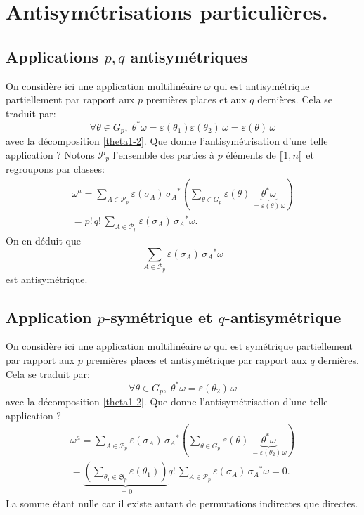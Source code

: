 \section*{Antisymétrisations particulières.}
\subsection*{Applications $p,q$ antisymétriques}
On considère ici une application multilinéaire $\omega$ qui est antisymétrique partiellement par rapport aux $p$ premières places et aux $q$ dernières. Cela se traduit par:
\[
 \forall \theta \in G_p,\; \theta^* \omega = \varepsilon(\theta_1) \varepsilon(\theta_2)\,\omega = \varepsilon(\theta)\, \omega
\]
avec la décomposition \ref{theta1-2}.\newline
Que donne l'antisymétrisation d'une telle application ?\newline
Notons $\mathcal{P}_p$ l'ensemble des parties à $p$ éléments de $\llbracket 1,n\rrbracket$ et regroupons par classes:
\begin{multline*}
 \omega^a = \sum_{A \in \mathcal{P}_p} \varepsilon(\sigma_A)\,{\sigma_A}^*\left( \sum_{\theta \in G_p}\varepsilon(\theta)\,\underset{=\varepsilon(\theta)\,\omega}{\underbrace{\theta^* \omega}}\right) \\
 = p!\,q!\,\sum_{A \in \mathcal{P}_p} \varepsilon(\sigma_A)\,{\sigma_A}^*\omega.
\end{multline*}
On en déduit que 
\[
 \sum_{A \in \mathcal{P}_p} \varepsilon(\sigma_A)\,{\sigma_A}^*\omega
\]
est antisymétrique.

\subsection*{Application $p$-symétrique et $q$-antisymétrique}
On considère ici une application multilinéaire $\omega$ qui est symétrique partiellement par rapport aux $p$ premières places et antisymétrique par rapport aux $q$ dernières. Cela se traduit par:
\[
 \forall \theta \in G_p,\; \theta^* \omega = \varepsilon(\theta_2)\,\omega
\]
avec la décomposition \ref{theta1-2}.\newline
Que donne l'antisymétrisation d'une telle application ?
\begin{multline*}
 \omega^a = \sum_{A \in \mathcal{P}_p} \varepsilon(\sigma_A)\,{\sigma_A}^*\left( \sum_{\theta \in G_p}\varepsilon(\theta)\,\underset{=\varepsilon(\theta_2)\,\omega}{\underbrace{\theta^* \omega}}\right) \\
 = \underset{ = 0}{\underbrace{\left( \sum_{\theta_1 \in \mathfrak{S}_p} \varepsilon(\theta_1)\right)}}q!\,\sum_{A \in \mathcal{P}_p} \varepsilon(\sigma_A)\,{\sigma_A}^* \omega
 = 0.
\end{multline*}
La somme étant nulle car il existe autant de permutations indirectes que directes.


